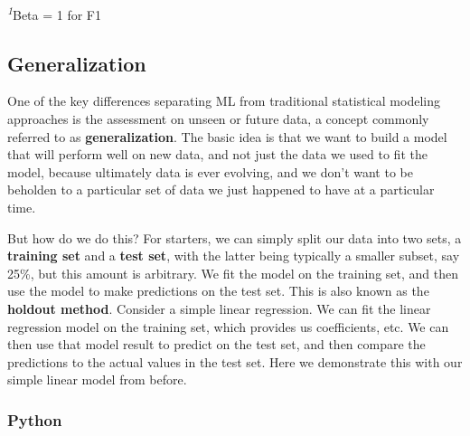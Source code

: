 \documentclass[
  letterpaper,
]{krantz}
\begin{document}
\begin{minipage}{\linewidth}
\textsuperscript{\textit{1}}Beta = 1 for F1\\
\end{minipage}

\subsection{Generalization}\label{generalization}

One of the key differences separating ML from traditional statistical
modeling approaches is the assessment on unseen or future data, a
concept commonly referred to as \textbf{generalization}. The basic idea
is that we want to build a model that will perform well on new data, and
not just the data we used to fit the model, because ultimately data is
ever evolving, and we don't want to be beholden to a particular set of
data we just happened to have at a particular time.

But how do we do this? For starters, we can simply split our data into
two sets, a \textbf{training set} and a \textbf{test set}, with the
latter being typically a smaller subset, say 25\%, but this amount is
arbitrary. We fit the model on the training set, and then use the model
to make predictions on the test set. This is also known as the
\textbf{holdout method}. Consider a simple linear regression. We can fit
the linear regression model on the training set, which provides us
coefficients, etc. We can then use that model result to predict on the
test set, and then compare the predictions to the actual values in the
test set. Here we demonstrate this with our simple linear model from
before.

\subsubsection{Python}
\end{document}
